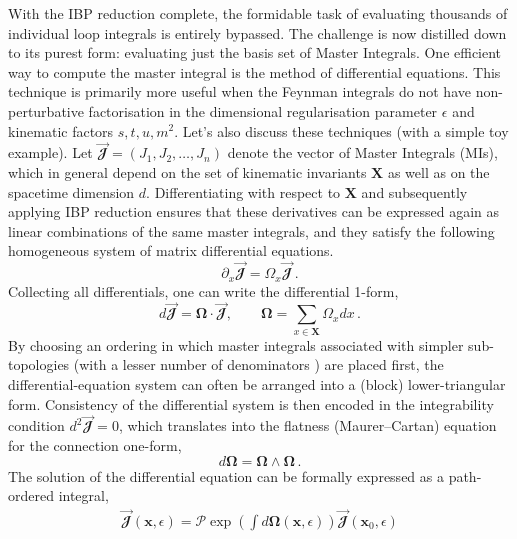 With the IBP reduction complete, the formidable task of evaluating thousands of individual loop integrals is entirely bypassed. The challenge is now distilled down to its purest form: evaluating just the basis set of Master Integrals. One efficient way to compute the master integral is the method of differential equations. This technique is primarily more useful when the Feynman integrals do not have non-perturbative factorisation in the dimensional regularisation parameter $\epsilon$ and kinematic factors $s,t,u,m^2$. Let's also discuss these techniques (with a simple toy example). Let $\vec{\mathbfcal{J}}=(J_1,J_2,\ldots,J_n)$ denote the vector of Master Integrals (MIs), which in general depend on the set of kinematic invariants
$\boldsymbol{X}$ as well as on the spacetime dimension $d$. Differentiating with respect to $\boldsymbol{X}$ and subsequently applying IBP reduction
ensures that these derivatives can be expressed again as linear combinations of the same master integrals, and they satisfy the following homogeneous system of matrix differential equations.
\begin{equation}
    \partial_{x}\vec{\mathbfcal{J}}=\Omega_{x}\vec{\mathbfcal{J}}\,.
\end{equation}
 Collecting all differentials, one can write the
differential 1-form,
\begin{equation}
    d\vec{\mathbfcal{J}}=\boldsymbol{\Omega}\cdot\vec{\mathbfcal{J}},\qquad \boldsymbol{\Omega}=\sum_{x\in \boldsymbol{X}}\Omega_xdx\,.\label{7}
\end{equation}
By choosing an ordering in which master integrals associated with simpler sub-topologies (with a lesser number of denominators ) are placed first, the differential-equation system can often be arranged into a (block) lower-triangular form. Consistency of the differential system is then encoded in the integrability condition $d^2\vec{\mathbfcal{J}}=0$, which translates into the flatness (Maurer--Cartan) equation for the connection one-form,
\begin{equation}
d\boldsymbol{\Omega}=\boldsymbol{\Omega}\wedge\boldsymbol{\Omega}\, .
\end{equation}
The solution of the differential equation can be formally expressed as a path-ordered integral,
\begin{equation}
    \begin{split}
        \vec{\mathbfcal{J}}(\boldsymbol{x},\epsilon)=\mathcal{P}\exp\left(\int d\boldsymbol\Omega(\boldsymbol{x},\epsilon)\right) \vec{\mathbfcal{J}}(\boldsymbol{x}_0,\epsilon)\label{9}
    \end{split}
\end{equation}
